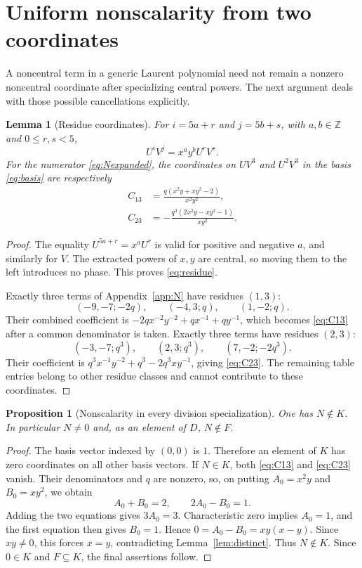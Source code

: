 \documentclass[11pt,letterpaper]{article}
\newtheorem{proposition}[theorem]{Proposition}
\newtheorem{lemma}[theorem]{Lemma}
\theoremstyle{definition}
\theoremstyle{remark}
\newcommand{\ZZ}{\mathbb Z}
\begin{document}
\section{Uniform nonscalarity from two coordinates}\label{sec:nonscalar}

A noncentral term in a generic Laurent polynomial need not remain a
nonzero noncentral coordinate after specializing central powers. The next
argument deals with those possible cancellations explicitly.

\begin{lemma}[Residue coordinates]\label{lem:coords}
For $i=5a+r$ and $j=5b+s$, with $a,b\in\ZZ$ and $0\leq r,s<5$,
\begin{equation}\label{eq:residue}
U^iV^j=x^ay^bU^rV^s.
\end{equation}
For the numerator \eqref{eq:Nexpanded}, the coordinates on $UV^3$ and
$U^2V^3$ in the basis \eqref{eq:basis} are respectively
\begin{align}
C_{13}&=\frac{q(x^2y+xy^2-2)}{x^2y^2},\label{eq:C13}\\
C_{23}&=-\frac{q^3(2x^2y-xy^2-1)}{xy^2}.\label{eq:C23}
\end{align}
\end{lemma}
\begin{proof}
The equality $U^{5a+r}=x^aU^r$ is valid for positive and negative $a$,
and similarly for $V$. The extracted powers of $x,y$ are central,
so moving them to the left introduces no phase. This proves
\eqref{eq:residue}.

Exactly three terms of Appendix~\ref{app:N} have residues $(1,3)$:
\[
(-9,-7;-2q),\qquad(-4,3;q),\qquad(1,-2;q).
\]
Their combined coefficient is
$-2qx^{-2}y^{-2}+qx^{-1}+qy^{-1}$, which becomes
\eqref{eq:C13} after a common denominator is taken. Exactly three terms
have residues $(2,3)$:
\[
(-3,-7;q^3),\qquad(2,3;q^3),\qquad(7,-2;-2q^3).
\]
Their coefficient is $q^3x^{-1}y^{-2}+q^3-2q^3xy^{-1}$, giving
\eqref{eq:C23}. The remaining table entries belong to other residue
classes and cannot contribute to these coordinates.
\end{proof}

\begin{proposition}[Nonscalarity in every division specialization]\label{prop:nonscalar}
One has $N\notin K$. In particular $N\ne0$ and, as an element of $D$,
$N\notin F$.
\end{proposition}
\begin{proof}
The basis vector indexed by $(0,0)$ is $1$. Therefore an element of $K$
has zero coordinates on all other basis vectors. If $N\in K$, both
\eqref{eq:C13} and \eqref{eq:C23} vanish. Their denominators and $q$ are
nonzero, so, on putting $A_0=x^2y$ and $B_0=xy^2$, we obtain
\[
A_0+B_0=2,\qquad 2A_0-B_0=1.
\]
Adding the two equations gives $3A_0=3$. Characteristic zero implies
$A_0=1$, and the first equation then gives $B_0=1$. Hence
$0=A_0-B_0=xy(x-y)$. Since $xy\ne0$, this forces $x=y$, contradicting
Lemma~\ref{lem:distinct}. Thus $N\notin K$. Since $0\in K$ and
$F\subseteq K$, the final assertions follow.
\end{proof}
\end{document}
